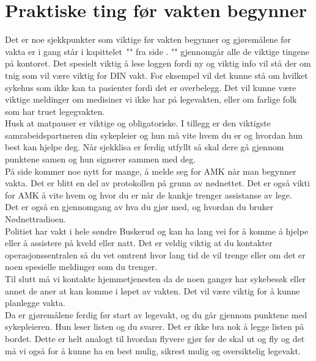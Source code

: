 \documentclass[12pt,a4paper]{memoir}
\begin{document}
	\section{Praktiske ting før vakten begynner}
	Det er noe sjekkpunkter som viktige før vakten begynner og gjøremålene før vakta er i gang står i kapittelet~"" fra side \pageref{chap:lv_start}. "" gjennomgår alle de viktige tingene på kontoret. Det spesielt viktig å lese loggen fordi ny og viktig info vil stå der om tnig som vil være viktig for DIN vakt. For eksempel vil det kunne stå om hvilket sykehus som ikke kan ta pasienter fordi det er overbelegg. Det vil kunne være viktige meldinger om medisiner vi ikke har på legevakten, eller om farlige folk som har truet legegvakten.\\

	Husk at matpauser er viktige og obligatoriske. I tillegg er den viktigste samrabeidspartneren din sykepleier og hun må vite hvem du er og hvordan hun best kan hjelpe deg. Når sjekklisa er ferdig utfyllt så skal dere gå gjennom punktene samen og hun signerer sammen med deg.\\

	På side \pageref{sec:start_AMK} kommer noe nytt for mange, å melde seg for AMK når man begynner vakta. Det er blitt en del av protokollen på grunn av nødnettet. Det er også vikti for AMK å vite hvem og hvor du er når de kankje trenger assistanse av lege.\\

	Det er også en gjennomgang av hva du gjør med, og hvordan du bruker Nødnettradioen.\\

	Politiet har vakt i hele søndre Buskerud og kan ha lang vei for å komme å hjelpe eller å assistere på kveld eller natt. Det er veldig viktig at du kontakter operasjonssentralen så du vet omtrent hvor lang tid de vil trenge eller om det er noen spesielle meldinger som du trenger. \\

	Til slutt må vi kontakte hjemmetjenesten da de noen ganger har sykebesøk eller annet de aner at kan komme i løpet av vakten. Det vil være viktig for å kunne planlegge vakta.\\

	Da er gjøremålene ferdig før start av legevakt, og du går gjennom punktene med sykepleieren. Hun leser listen og du svarer. Det er ikke bra nok å legge listen på bordet. Dette er helt analogt til hvordan flyvere gjør før de skal ut og fly og det må vi også for å kunne ha en best mulig, sikrest mulig og oversiktelig legevakt.
\end{document}
